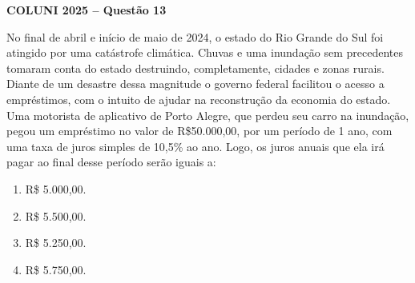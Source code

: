 \textbf{COLUNI 2025 -- Questão 13}\par\medskip No final de abril e início de maio de 2024, o estado do Rio Grande do Sul foi atingido por uma catástrofe climática. Chuvas e uma inundação sem precedentes tomaram conta do estado destruindo, completamente, cidades e zonas rurais. Diante de um desastre dessa magnitude o governo federal facilitou o acesso a empréstimos, com o intuito de ajudar na reconstrução da economia do estado. Uma motorista de aplicativo de Porto Alegre, que perdeu seu carro na inundação, pegou um empréstimo no valor de R\$50.000,00, por um período de 1 ano, com uma taxa de juros simples de 10,5\% ao ano. Logo, os juros anuais que ela irá pagar ao final desse período serão iguais a:
\begin{enumerate}
\item R\$ 5.000,00.
\item R\$ 5.500,00.
\item R\$ 5.250,00.
\item R\$ 5.750,00.
\end{enumerate}
